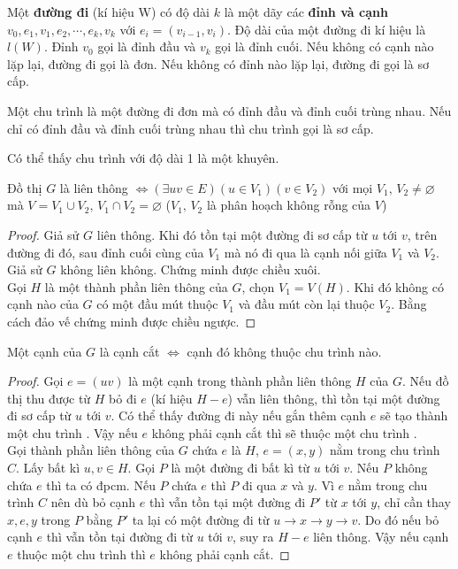 \begin{definition}[đường đi]
	\label{def:duong-di}
	Một \textbf{đường đi} (kí hiệu W) có độ dài $k$ là một dãy các \textbf{đỉnh và cạnh} $v_0, e_1, v_1, e_2,\cdots,e_k,v_k$ với $e_i = (v_{i-1},v_i)$. Độ dài của một đường đi kí hiệu là $l(W)$. Đỉnh $v_0$ gọi là đỉnh đầu và $v_k$ gọi là đỉnh cuối. Nếu không có cạnh nào lặp lại, đường đi gọi là đơn. Nếu không có đỉnh nào lặp lại, đường đi gọi là sơ cấp.
\end{definition}
\begin{definition}
	\label{def:chu-trinh}
	 Một chu trình là một đường đi đơn mà có đỉnh đầu và đỉnh cuối trùng nhau. Nếu chỉ có đỉnh đầu và đỉnh cuối trùng nhau thì chu trình gọi là sơ cấp.
\end{definition}
Có thể thấy chu trình với độ dài 1 là một khuyên.
\begin{proposition}
	Đồ thị $G$ là liên thông $\iff ({\exists uv \in E})({ u\in V_1})({v \in V_2})$ với mọi $V_1,\,V_2 \ne \varnothing$ mà $V = V_1\cup V_2,\, V_1 \cap V_2 = \varnothing$ ($V_1,\,V_2$ là phân hoạch không rỗng của $V$)
	\begin{proof}
		Giả sử $G$ liên thông. Khi đó tồn tại một đường đi sơ cấp từ $u$ tới $v$, trên đường đi đó, sau đỉnh cuối cùng của $V_1$ mà nó đi qua là cạnh nối giữa $V_1$ và $V_2$. Giả sử $G$ không liên không. Chứng minh được chiều xuôi.\\
		Gọi $H$ là một thành phần liên thông của $G$, chọn $V_1 = V(H)$. Khi đó không có cạnh nào của $G$ có một đầu mút thuộc $V_1$ và đầu mút còn lại thuộc $V_2$. Bằng cách đảo vế chứng minh được chiều ngược.
	\end{proof}
\end{proposition}

\begin{theorem}
Một cạnh của $G$ là cạnh cắt $\iff$ cạnh đó không thuộc chu trình nào.	
\begin{proof}
	Gọi $e=(uv)$ là một cạnh trong thành phần liên thông $H$ của $G$. Nếu đồ thị thu được từ $H$ bỏ đi $e$ (kí hiệu $H-e$) vẫn liên thông, thì tồn tại một đường đi sơ cấp từ $u$ tới $v$. Có thể thấy đường đi này nếu gắn thêm cạnh $e$ sẽ tạo thành một chu trình . Vậy nếu $e$ không phải cạnh cắt thì sẽ thuộc một chu trình . \\
	Gọi thành phần liên thông của $G$ chứa $e$ là $H$, $e = (x,y)$ nằm trong chu trình $C$. Lấy bất kì $u,v \in H$. Gọi $P$ là một đường đi bất kì từ $u$ tới $v$. Nếu $P$ không chứa $e$ thì ta có đpcm. Nếu $P$ chứa $e$ thì $P$ đi qua $x$ và $y$. Vì $e$ nằm trong chu trình $C$ nên dù bỏ cạnh $e$ thì vẫn tồn tại một đường đi $P'$ từ $x$ tới $y$, chỉ cần thay $x,e,y$ trong $P$ bằng $P'$ ta lại có một đường đi từ $u \to x \to y \to v$. Do đó nếu bỏ cạnh $e$ thì vẫn tồn tại đường đi từ $u$ tới $v$, suy ra $H-e$ liên thông. Vậy nếu cạnh $e$ thuộc một chu trình thì $e$ không phải cạnh cắt.
\end{proof}
\end{theorem}

